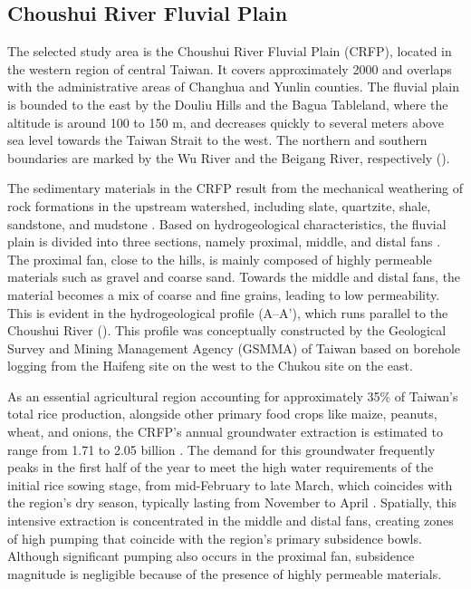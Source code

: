 
\subsection{Choushui River Fluvial Plain}

The selected study area is the Choushui River Fluvial Plain (CRFP), located in the western region of central Taiwan. It covers approximately 2000  and overlaps with the administrative areas of Changhua and Yunlin counties. The fluvial plain is bounded to the east by the Douliu Hills and the Bagua Tableland, where the altitude is around 100 to 150 m, and decreases quickly to several meters above sea level towards the Taiwan Strait to the west. The northern and southern boundaries are marked by the Wu River and the Beigang River, respectively ().

The sedimentary materials in the CRFP result from the mechanical weathering of rock formations in the upstream watershed, including slate, quartzite, shale, sandstone, and mudstone \citep{RN17, RN47}. Based on hydrogeological characteristics, the fluvial plain is divided into three sections, namely proximal, middle, and distal fans \citep{RN46}. The proximal fan, close to the hills, is mainly composed of highly permeable materials such as gravel and coarse sand. Towards the middle and distal fans, the material becomes a mix of coarse and fine grains, leading to low permeability. This is evident in the hydrogeological profile ($\text{A--A'}$), which runs parallel to the Choushui River (). This profile was conceptually constructed by the Geological Survey and Mining Management Agency (GSMMA) of Taiwan based on borehole logging from the Haifeng site on the west to the Chukou site on the east.

As an essential agricultural region accounting for approximately 35\% of Taiwan's total rice production, alongside other primary food crops like maize, peanuts, wheat, and onions, the CRFP's annual groundwater extraction is estimated to range from 1.71 to 2.05 billion  \citep{craf_pumping}. The demand for this groundwater frequently peaks in the first half of the year to meet the high water requirements of the initial rice sowing stage, from mid-February to late March, which coincides with the region's dry season, typically lasting from November to April \citep{RN64}. Spatially, this intensive extraction is concentrated in the middle and distal fans, creating zones of high pumping that coincide with the region's primary subsidence bowls. Although significant pumping also occurs in the proximal fan, subsidence magnitude is negligible because of the presence of highly permeable materials.


